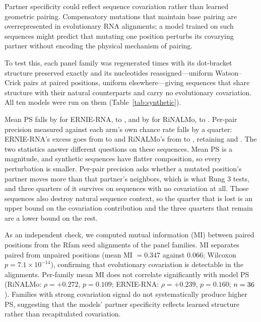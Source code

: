 \documentclass[11pt]{article}
\begin{document}
Partner specificity could reflect sequence covariation rather than
learned geometric pairing. Compensatory mutations that maintain base
pairing are overrepresented in evolutionary RNA alignments; a model
trained on such sequences might predict that mutating one position
perturbs its covarying partner without encoding the physical mechanism
of pairing.

To test this, each panel family was regenerated \synPerFamily{} times with its
dot-bracket structure preserved exactly and its nucleotides reassigned---uniform
Watson--Crick pairs at paired positions, uniform elsewhere---giving \synN{}
sequences that share structure with their natural counterparts and carry no
evolutionary covariation. All ten models were run on them
(Table~\ref{tab:synthetic}).



Mean PS falls by \synPSDropErnieRNA{} for ERNIE-RNA, to \synPSErnieRNA{}, and
by \synPSDropRiNALMo{} for RiNALMo, to \synPSRiNALMo{}. Per-pair precision
measured against each arm's own chance rate falls by a quarter: ERNIE-RNA's
excess goes from \natExcessErnieRNA{} to \synExcessErnieRNA{} and RiNALMo's
from \natExcessRiNALMo{} to \synExcessRiNALMo{}, retaining
\synRetainedErnieRNA{} and \synRetainedRiNALMo{}. The two statistics answer
different questions on these sequences. Mean PS is a magnitude, and synthetic
sequences have flatter composition, so every perturbation is smaller. Per-pair
precision asks whether a mutated position's partner moves more than that
partner's neighbors, which is what Rung 3 tests, and three quarters of it
survives on sequences with no covariation at all. Those sequences also destroy
natural sequence context, so the quarter that is lost is an upper bound on the
covariation contribution and the three quarters that remain are a lower bound
on the rest.

As an independent check, we computed mutual information (MI) between
paired positions from the Rfam seed alignments of the \panelN{} panel families.
MI separates paired from unpaired positions (mean MI $= 0.347$ against
$0.066$; Wilcoxon $p = 7.1 \times 10^{-14}$), confirming that evolutionary
covariation is detectable in the alignments. Per-family mean MI does not
correlate significantly with model PS (RiNALMo: $\rho = +0.272$, $p = 0.109$;
ERNIE-RNA: $\rho = +0.239$, $p = 0.160$; $n = 36{}$). Families with strong covariation signal
do not systematically produce higher PS, suggesting that the models'
partner specificity reflects learned structure rather than
recapitulated covariation.
\end{document}
